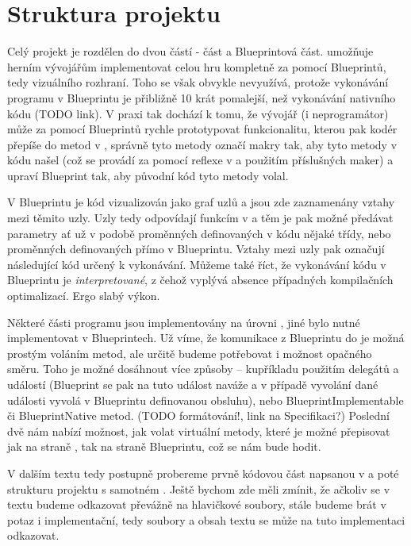 
\section{Struktura projektu}

Celý projekt je rozdělen do dvou částí - \CPP{} část a Blueprintová část. \UE{} umožňuje herním vývojářům implementovat celou hru kompletně za pomocí Blueprintů, tedy vizuálního rozhraní. Toho se však obvykle nevyužívá, protože vykonávání programu v Blueprintu je přibližně 10 krát pomalejší, než vykonávání nativního \CPP{} kódu (TODO link). V praxi tak dochází k tomu, že vývojář (i neprogramátor) může za pomocí Blueprintů rychle prototypovat funkcionalitu, kterou pak kodér přepíše do metod v \CPP{}, správně tyto metody označí makry tak, aby \UE{} tyto metody v kódu našel (což se provádí za pomocí reflexe v \UBT{} a použitím příslušných \CPP{} maker) a upraví Blueprint tak, aby původní kód tyto metody volal.

 V Blueprintu je kód vizualizován jako graf uzlů a jsou zde zaznamenány vztahy mezi těmito uzly. Uzly tedy odpovídají funkcím v \CPP{} a těm je pak možné předávat parametry ať už v podobě proměnných definovaných v \CPP{} kódu nějaké třídy, nebo proměnných definovaných přímo v Blueprintu. Vztahy mezi uzly pak označují následující kód určený k vykonávání. Můžeme také říct, že vykonávání kódu v Blueprintu je \textit{interpretované}, z čehož vyplývá absence případných kompilačních optimalizací. Ergo slabý výkon. 

Některé části programu jsou implementovány na úrovni \CPP{}, jiné bylo nutné implementovat v Blueprintech. Už víme, že komunikace z Blueprintu do \CPP{} je možná prostým voláním metod, ale určitě budeme potřebovat i možnost opačného směru. Toho je možné dosáhnout více způsoby -- kupříkladu použitím delegátů a událostí (Blueprint se pak na tuto událost naváže a v případě vyvolání dané události vyvolá v Blueprintu definovanou obsluhu), nebo BlueprintImplementable či BlueprintNative metod. (TODO formátování!, link na Specifikaci?) Poslední dvě nám nabízí možnost, jak volat virtuální metody, které je možné přepisovat jak na straně \CPP{}, tak na straně Blueprintu, což se nám bude hodit.

V dalším textu tedy postupně probereme prvně kódovou část napsanou v \CPP{} a poté strukturu projektu s samotném \UE{}. Ještě bychom zde měli zmínit, že ačkoliv se v textu budeme odkazovat převážně na hlavičkové soubory, stále budeme brát v potaz i implementační, tedy  soubory a obsah textu se může na tuto implementaci odkazovat.


